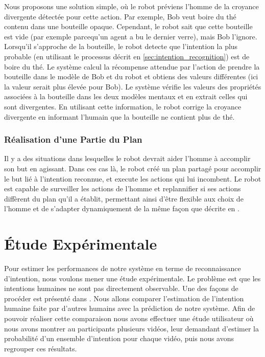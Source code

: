 \documentclass[a4paper,11pt,twoside]{StyleThese}
\begin{document}
Nous proposons une solution simple, où le robot préviens l'homme de la croyance divergente détectée pour cette action. Par exemple, Bob veut boire du thé contenu dans une bouteille opaque. Cependant, le robot sait que cette bouteille est vide (par exemple parcequ'un agent a bu le dernier verre), mais Bob l'ignore. Lorsqu'il s'approche de la bouteille, le robot detecte que l'intention la plus probable (en utilisant le processus décrit en  \ref{sec:intention_recognition}) est de boire du thé. Le système calcul la récompense attendue par l'action de prendre la bouteille dans le modèle de Bob et du robot et obtiens des valeurs différentes (ici la valeur serait plus élevée pour Bob). Le système vérifie les valeurs des propriétés associées à la bouteille dans les deux modèles mentaux et en extrait celles qui sont divergentes. En utilisant cette information, le robot corrige la croyance divergente en informant l'humain que la bouteille ne contient plus de thé.


\subsubsection{Réalisation d'une Partie du Plan}
\label{robot_acts}
Il y a des situations dans lesquelles le robot devrait aider l'homme à accomplir son but en agissant. Dans ces cas là, le robot créé un plan partagé pour accomplir le but lié à l'intention reconnue, et execute les actions qui lui incombent. Le robot est capable de surveiller les actions de l'homme et replannifier si ses actions diffèrent du plan qu'il a établit, permettant ainsi d'être flexible aux choix de l'homme et de s'adapter dynamiquement de la même façon que décrite en \cite{fioreiser2014}.
\vspace{-5pt}


\section{Étude Expérimentale}
Pour estimer les performances de notre système en terme de reconnaissance d'intention, nous voulons mener une étude expérimentale. Le problème est que les intentions humaines ne sont pas directement observable. Une des façons de procéder est présenté dans \cite{baker2014modeling}. Nous allons comparer l'estimation de l'intention humaine faite par d'autres humains avec la prédiction de notre système. Afin de pouvoir réaliser cette comparaison nous avons effectuer une étude utilisateur où nous avons montrer au participants plusieurs vidéos, leur demandant d'estimer la probabilité d'un ensemble d'intention pour chaque vidéo, puis nous avons regrouper ces résultats.
\end{document}
